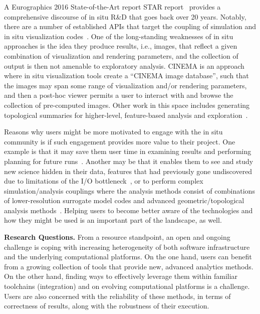 A Eurographics 2016 State-of-the-Art report STAR report~\cite{Bauer16} provides a comprehensive discourse of in situ R\&D that goes back over 20 years. 
Notably, there are a number of established APIs that target the coupling of simulation and in situ visualization codes~\cite{Fabian2011, Whitlock2011, Ayachit16a, Ayachit16b, Larsen17}.
One of the long-standing weaknesses of in situ approaches is the idea they produce results, i.e., images, that reflect a given combination of visualization and rendering parameters, and the collection of output is then not amenable to exploratory analysis.
CINEMA\cite{Ahrens14} is an approach where in situ visualization tools create a ``CINEMA image database'', such that the images may span some range of visualization and/or rendering parameters, and then a post-hoc viewer permits a user to interact with and browse the collection of pre-computed images. 
Other work in this space includes generating topological summaries for higher-level, feature-based analysis and exploration~\cite{Biedert15}. 

Reasons why users might be more motivated to engage with the in situ community is if such engagement provides more value to their project. 
One example is that it may save them user time in examining results and performing planning for future runs~\cite{Patchett2018}. 
Another may be that it enables them to see and study new science hidden in their data, features that had previously gone undiscovered due to limitations of the I/O bottleneck~\cite{Ruebel2016}, or to perform complex simulation/analysis couplings where the analysis methods consist of combinations of lower-resolution surrogate model codes and advanced geometric/topological analysis methods~\cite{Morozov16}. 
Helping users to become better aware of the technologies and how they might be used is an important part of the landscape, as well. 

\medskip\noindent
\textbf{\sffamily Research Questions.} 
From a resource standpoint, an open and ongoing challenge is coping with increasing heterogeneity of both software infrastructure and the underlying computational platforms. 
On the one hand, users can benefit from a growing collection of tools that provide new, advanced analytics methods. 
On the other hand, finding ways to effectively leverage them within familiar toolchains (integration) and on evolving computational platforms is a challenge. 
Users are also concerned with the reliability of these methods, in terms of correctness of results, along with the robustness of their execution.

